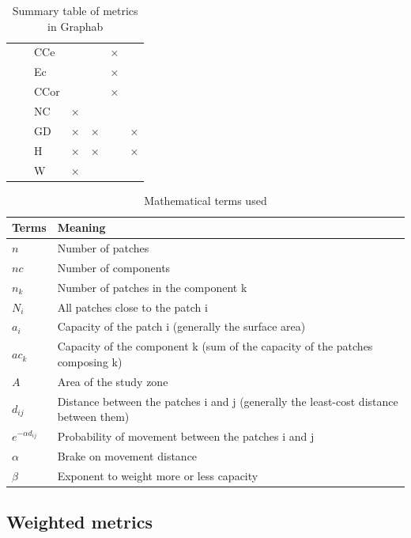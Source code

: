 \documentclass{article}
\begin{document}
\begin{table}[H]
\begin{tabular}{|c|l|l|c|c|c|c|}
	& \nameref{metric_CCe} & CCe &  &  & × & \\
	\hhline{~------}
	& \nameref{metric_Ec} & Ec &  &  & × & \\
	\hhline{~------}
	& \nameref{metric_CCor} & CCor &  &  & × & \\
	\hhline{~------}
	& \nameref{metric_NC} & NC & × &  &  & \\
	\hhline{~------}
	& \nameref{metric_GD} & GD & × & × &  & ×\\
	\hhline{~------}
	& \nameref{metric_H} & H & × & × &  & ×\\
	\hhline{~------}
	& \nameref{metric_W} & W & × &  &  & \\
	\hline
\end{tabular}
\caption{Summary table of metrics in Graphab}
\end{table}

\bigskip

\begin{table}[H]
	\begin{tabular}{|m{2cm}|m{13cm}|}
		\hline
		Terms & Meaning\\\hline
		$n$	& Number of patches\\\hline
		$nc$ & Number of components\\\hline
		${n}_{k}$ &	Number of patches in the component k\\\hline
		${N}_{i}$ &	All patches close to the patch i\\\hline
		${a}_{i}$ &	Capacity of the patch i (generally the surface area)\\\hline
		${ac}_{k}$ & Capacity of the component k (sum of the capacity of the patches composing k)\\\hline
		$A$	& Area of the study zone \\\hline
		${d}_{ij}$ & Distance between the patches i and j (generally the least-cost distance between them) \\\hline
		${e}^{-\alpha {d}_{ij}}$ & Probability of movement between the patches i and j\\\hline
		$\alpha$ & Brake on movement distance  \\\hline
		$\beta$	& Exponent to weight more or less capacity\\\hline
	\end{tabular}
	\caption{Mathematical terms used}
\end{table}


\subsection{Weighted metrics}
\label{weight_metric}
\end{document}
